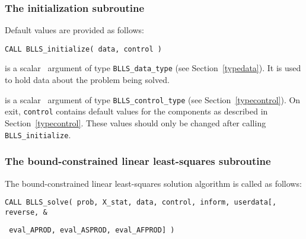\documentclass{galahad}
\newcommand{\packagename}{BLLS}
\begin{document}

\subsubsection{The initialization subroutine}\label{subinit}
 Default values are provided as follows:
\vspace*{1mm}

\hspace{8mm}
{\tt CALL \packagename\_initialize( data, control )}

\vspace*{-3mm}
\begin{description}

 is a scalar \intentinout\ argument of type
{\tt \packagename\_data\_type}
(see Section~\ref{typedata}). It is used to hold data about the problem being
solved.

 is a scalar \intentout\ argument of type
{\tt \packagename\_control\_type}
(see Section~\ref{typecontrol}).
On exit, {\tt control} contains default values for the components as
described in Section~\ref{typecontrol}.
These values should only be changed after calling
{\tt \packagename\_initialize}.

\end{description}


\subsubsection{The bound-constrained linear least-squares subroutine}\label{qps}
The bound-constrained linear least-squares solution algorithm is called
as follows:
\vspace*{1mm}

\hspace{8mm}
{\tt CALL \packagename\_solve( prob, X\_stat, data, control, inform, userdata[,
reverse, %
\&}
\vspace*{-1mm}

\hspace{37mm}
{\tt
eval\_APROD, eval\_ASPROD, eval\_AFPROD] )}
\end{document}
